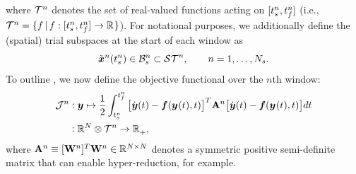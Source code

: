 where  $\timeSpaceArg{n}$ denotes the set of real-valued functions acting on
$[\timeStartArg{n},\timeEndArg{n}]$ (i.e., $\timeSpaceArg{n} =
\{f\,|\,f:[\timeStartArg{n},\timeEndArg{n}]\rightarrow\RR{}\}$).
For notational purposes, we additionally define the (spatial) trial subspaces at the start of each window as
$$\approxstateArg{n}{\timeStartArg{n}} \in \stspaceBoundStartArg{n} \subset \stspaceArg{n}, \qquad n=1,\ldots,\nslabs. 
$$ 
To outline \methodAcronym, we now define the objective functional over the $n$th window:
\begin{equation}\label{eq:obj}
\begin{split} \mathcal{J}^n &\vcentcolon \statey \mapsto
\frac{1}{2} \int_{\timeStartArg{n}}^{\timeEndArg{n}} \big[ \dot{\statey}(t)
- \velocity(\stateyArg{}{t},t) \big]^T \stweightingMatArgt{n}{t} \big[
\dot{\statey}(t) - \velocity(\stateyArg{}{t},t) \big] d t \\
&\vcentcolon \RR{\fomdim}\otimes \timeSpaceArg{n}  \rightarrow
\RRplus, 
\end{split}
\end{equation}
where $\stweightingMatArg{n} \equiv \stweightingMatOneTArg{n}
\stweightingMatOneArg{n} \in \RR{\fomdim \times \fomdim}$ denotes a
symmetric positive semi-definite matrix that can enable hyper-reduction, for
example. 

